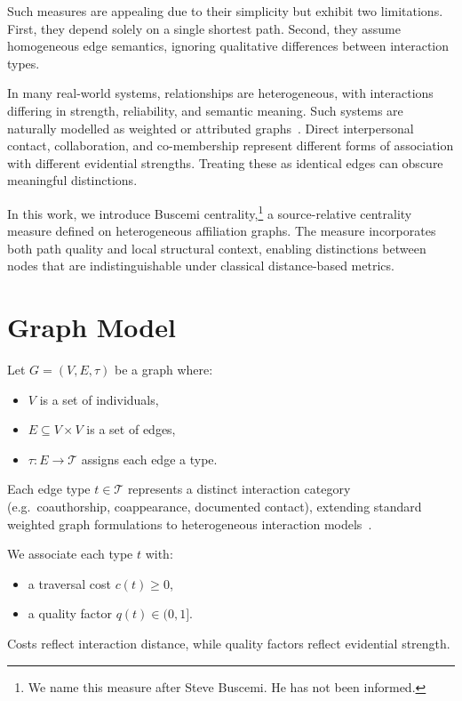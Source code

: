 \documentclass[11pt]{article}
\begin{document}
Such measures are appealing due to their simplicity but exhibit two limitations. First, they depend solely on a single shortest path. Second, they assume homogeneous edge semantics, ignoring qualitative differences between interaction types.

In many real-world systems, relationships are heterogeneous, with interactions differing in strength, reliability, and semantic meaning. Such systems are naturally modelled as weighted or attributed graphs~\cite{newman2010networks}. Direct interpersonal contact, collaboration, and co-membership represent different forms of association with different evidential strengths. Treating these as identical edges can obscure meaningful distinctions.

In this work, we introduce Buscemi centrality,\footnote{We name this measure after Steve Buscemi. He has not been informed.} a source-relative centrality measure defined on heterogeneous affiliation graphs. The measure incorporates both path quality and local structural context, enabling distinctions between nodes that are indistinguishable under classical distance-based metrics.

\section{Graph Model}

Let $G = (V, E, \tau)$ be a graph where:
\begin{itemize}
\item $V$ is a set of individuals,
\item $E \subseteq V \times V$ is a set of edges,
\item $\tau : E \to \mathcal{T}$ assigns each edge a type.
\end{itemize}

Each edge type $t \in \mathcal{T}$ represents a distinct interaction category (e.g.\ coauthorship, coappearance, documented contact), extending standard weighted graph formulations to heterogeneous interaction models~\cite{newman2010networks}.

We associate each type $t$ with:
\begin{itemize}
\item a traversal cost $c(t) \ge 0$,
\item a quality factor $q(t) \in (0,1]$.
\end{itemize}

Costs reflect interaction distance, while quality factors reflect evidential strength.
\end{document}
